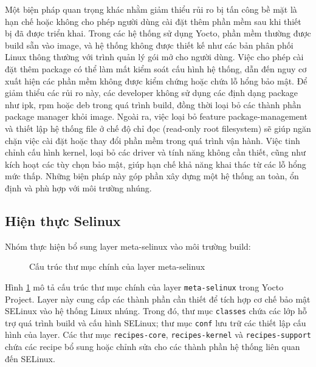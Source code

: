 Một biện pháp quan trọng khác nhằm giảm thiểu rủi ro bị tấn công bề mặt là hạn chế hoặc không cho phép người dùng cài đặt thêm phần mềm sau khi thiết bị đã được triển khai. Trong các hệ thống sử dụng Yocto, phần mềm thường được build sẵn vào image, và hệ thống không được thiết kế như các bản phân phối Linux thông thường với trình quản lý gói mở cho người dùng. Việc cho phép cài đặt thêm package có thể làm mất kiểm soát cấu hình hệ thống, dẫn đến nguy cơ xuất hiện các phần mềm không được kiểm chứng hoặc chứa lỗ hổng bảo mật. Để giảm thiểu các rủi ro này, các developer không sử dụng các định dạng package như ipk, rpm hoặc deb trong quá trình build, đồng thời loại bỏ các thành phần package manager khỏi image. Ngoài ra, việc loại bỏ feature package-management và thiết lập hệ thống file ở chế độ chỉ đọc (read-only root filesystem) sẽ giúp ngăn chặn việc cài đặt hoặc thay đổi phần mềm trong quá trình vận hành.
Việc tinh chỉnh cấu hình kernel, loại bỏ các driver và tính năng không cần thiết, cũng như kích hoạt các tùy chọn bảo mật, giúp hạn chế khả năng khai thác từ các lỗ hổng mức thấp. Những biện pháp này góp phần xây dựng một hệ thống an toàn, ổn định và phù hợp với môi trường nhúng.



\subsection{Hiện thực Selinux}

Nhóm thực hiện bổ sung layer meta-selinux vào môi trường build:
\medskip

\begin{figure}[!h]
\renewcommand*\DTstyle{\ttfamily}
\caption{Cấu trúc thư mục chính của layer meta-selinux}
\label{fig:meta-selinux-structure}
\end{figure}
Hình \ref{fig:meta-selinux-structure} mô tả cấu trúc thư mục chính của layer \texttt{meta-selinux} trong Yocto Project. Layer này cung cấp các thành phần cần thiết để tích hợp cơ chế bảo mật SELinux vào hệ thống Linux nhúng. Trong đó, thư mục \texttt{classes} chứa các lớp hỗ trợ quá trình build và cấu hình SELinux; thư mục \texttt{conf} lưu trữ các thiết lập cấu hình của layer. Các thư mục \texttt{recipes-core}, \texttt{recipes-kernel} và \texttt{recipes-support} chứa các recipe bổ sung hoặc chỉnh sửa cho các thành phần hệ thống liên quan đến SELinux.


